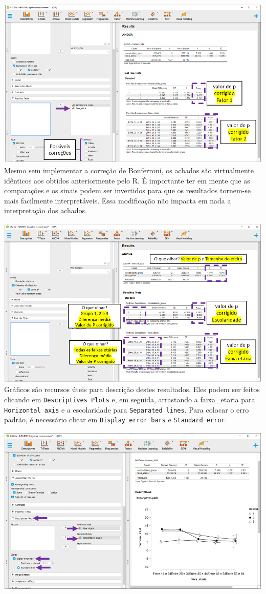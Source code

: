 \documentclass[
]{book}
\begin{document}
\includegraphics{./img/cap_anova_two_way_posthoc2.png} Mesmo sem
implementar a correção de Bonferroni, os achados são virtualmente
idênticos aos obtidos anteriormente pelo R. É importante ter em mente
que as comparações e os sinais podem ser invertidos para que os
resultados tornem-se mais facilmente interpretáveis. Essa modificação
não impacta em nada a interpretação dos achados.

\includegraphics{./img/cap_anova_two_way_posthoc_interpretacao.png}
Gráficos são recursos úteis para descrição destes resultados. Eles podem
ser feitos clicando em \texttt{Descriptives\ Plots} e, em seguida,
arrastando a faixa\_etaria para \texttt{Horizontal\ axis} e a
escolaridade para \texttt{Separated\ lines}. Para colocar o erro padrão,
é necessário clicar em \texttt{Display\ error\ bars} e
\texttt{Standard\ error}.

\includegraphics{./img/cap_anova_two_way_descriptives_final.png}
\end{document}
